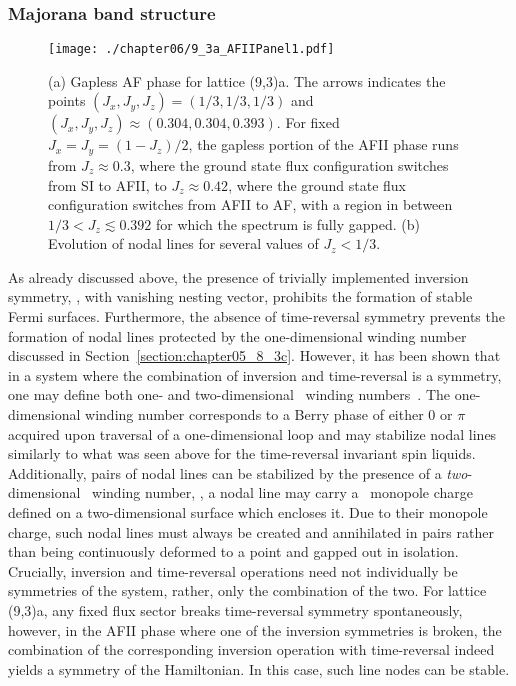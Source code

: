 \subsubsection{Majorana band structure}
%
%
%
\begin{figure}[tb]
	\centering
	\texttt{[image: ./chapter06/9\_3a\_AFIIPanel1.pdf]}
	\caption{
		(a) Gapless AF phase for lattice (9,3)a.
		The arrows indicates the points $(J_x, J_y, J_z) = (1/3, 1/3, 1/3)$ and $(J_x, J_y, J_z) \approx (0.304, 0.304, 0.393)$.
		For fixed $J_x = J_y = (1 - J_z)/2$, the gapless portion of the AFII phase runs from $J_z \approx 0.3$, where the ground state flux configuration switches from SI to AFII, to $J_z \approx 0.42$, where the  ground state flux configuration switches from AFII to AF, with a region in between $1/3 < J_z \lesssim 0.392$ for which the spectrum is fully gapped.
		(b) Evolution of nodal lines for several values of $J_z < 1/3$.
	}
	\label{fig:chapter06_AFIIPanel}
\end{figure}
%
As already discussed above, the presence of trivially implemented inversion symmetry, \ie, with vanishing nesting vector, prohibits the formation of stable Fermi surfaces.
Furthermore, the absence of time-reversal symmetry prevents the formation of nodal lines protected by the one-dimensional winding number discussed in Section~\ref{section:chapter05_8_3c}.
%
%
%
However, it has been shown that in a system where the combination of inversion and time-reversal is a symmetry, one may define both one- and two-dimensional \ZZ~winding numbers~\cite{KimPRL2015,FangPRB2015}.
The one-dimensional winding number corresponds to a Berry phase of either 0 or $\pi$ acquired upon traversal of a one-dimensional loop and may stabilize nodal lines similarly to what was seen above for the time-reversal invariant spin liquids.
Additionally, pairs of nodal lines can be stabilized by the presence of a \textit{two}-dimensional \ZZ~winding number, \ie, a nodal line may carry a \ZZ~monopole charge defined on a two-dimensional surface which encloses it.
Due to their monopole charge, such nodal lines must always be created and annihilated in pairs rather than being continuously deformed to a point and gapped out in isolation.
Crucially, inversion and time-reversal operations need not individually be symmetries of the system, rather, only the combination of the two.
For lattice (9,3)a, any fixed flux sector breaks time-reversal symmetry spontaneously, however, in the AFII phase where one of the inversion symmetries is broken, the combination of the corresponding inversion operation with time-reversal indeed yields a symmetry of the Hamiltonian.
In this case, such line nodes can be stable.

